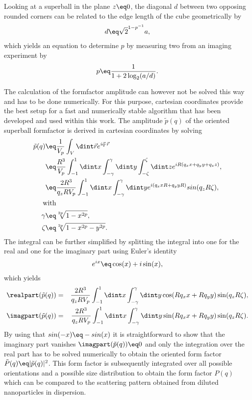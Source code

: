 \documentclass[\main/dresen_thesis.tex]{subfiles}
\begin{document}
Looking at a superball in the plane $z \eq 0$, the diagonal $d$ between two opposing rounded corners can be related to the edge length of the cube geometrically by
\begin{align}
  d \eq \sqrt{2}^{1-p^{-1}}a,
\end{align}
which yields an equation to determine $p$ by measuring two from an imaging experiment by
\begin{align}
  p \eq \frac{1}{1 + 2\log_2(a/d)}.
\end{align}

The calculation of the formfactor amplitude can however not be solved this way and has to be done numerically.
For this purpose, cartesian coordinates provide the best setup for a fast and numerically stable algorithm that has been developed and used within this work.
The amplitude $\tilde{p}(q)$ of the oriented superball formfactor is derived in cartesian coordinates by solving
\begin{align}
  \tilde{p}(q) \eq& \frac{1}{V_p} \int_{V} \dint \vec{r} e^{i \vec{q} \cdot \vec{r}}\\
  \eq& \frac{R^3}{V_p} \int_{-1}^{1} \dint x \int_{-\gamma}^{\gamma} \dint y \int_{-\zeta}^{\zeta} \dint z  e^{iR(q_x x + q_y y + q_z z)},\\
  \eq& \frac{2R^3}{q_z R V_p} \int_{-1}^{1} \dint x \int_{-\gamma}^{\gamma} \dint y  e^{i (q_x x R + q_y y R)} sin(q_z R \zeta),\\
  \mathrm{with}\nonumber\\
  \gamma \eq& \sqrt[2p]{1-x^{2p}}, \\
  \zeta \eq& \sqrt[2p]{1-x^{2p} -y^{2p}}.
\end{align}
The integral can be further simplified by splitting the integral into one for the real and one for the imaginary part using Euler's identity
\begin{align}
  e^{ix} \eq \cos(x) + i \sin(x),
\end{align}
which yields
\begin{align}
  \realpart (\tilde{p}(q)) &=& \frac{2R^3}{q_z R V_p} \int_{-1}^{1} \dint x \int_{-\gamma}^{\gamma} \dint y \cos(R q_x x + R q_y y)  \sin (q_z R \zeta),\\
  \imagpart (\tilde{p}(q)) &=& \frac{2R^3}{q_z R V_p} \int_{-1}^{1} \dint x \int_{-\gamma}^{\gamma} \dint y \sin(R q_x x + R q_y y) \sin (q_z R \zeta).
\end{align}
By using that $sin(-x) \eq - sin(x)$ it is straightforward to show that the imaginary part vanishes $\imagpart (\tilde{p}(q)) \eq 0$ and only the integration over the real part has to be solved numerically to obtain the oriented form factor $\tilde{P}(q) \eq |\tilde{p}(q)|^2$. This form factor is subsequently integrated over all possible orientations and a possible size distribution to obtain the form factor $P(q)$ which can be compared to the scattering pattern obtained from diluted nanoparticles in dispersion.
\end{document}
